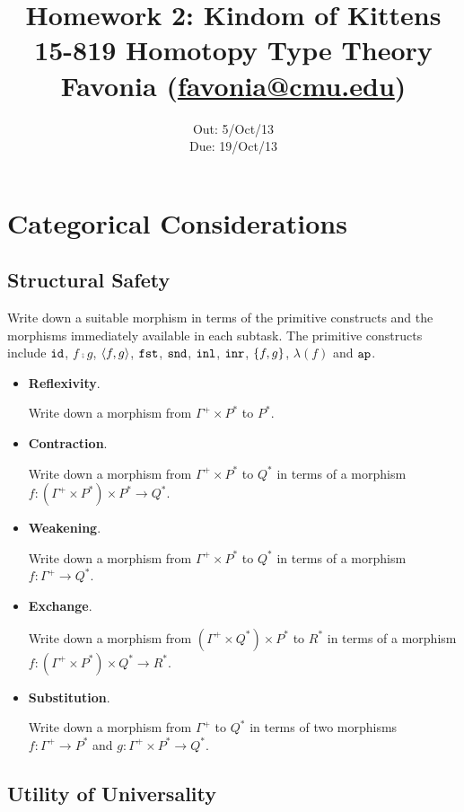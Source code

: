 \documentclass[12pt]{article}
\title{\Large\textbf{
  Homework 2: Kindom of Kittens}
\normalsize\\
15-819 Homotopy Type Theory\\
Favonia (\href{mailto:favonia@cmu.edu}{favonia@cmu.edu})}
\author{}
\date{%
Out: 5/Oct/13\\
Due: 19/Oct/13
}
\begin{document}
\maketitle

\section{Categorical Considerations}

\subsection{Structural Safety}

\begin{task}\label{task:struct}
  Write down a suitable morphism in terms of the primitive constructs
  and the morphisms immediately available in each subtask.
  The primitive constructs include
  $\mathtt{id}$, $f \comp g$, $\langle f,g\rangle$, $\mathtt{fst}$, $\mathtt{snd}$, $\mathtt{inl}$, $\mathtt{inr}$, $\{ f,g\}$, $\lambda(f)$ and $\mathtt{ap}$.
  \begin{itemize}
    \item
      \textbf{Reflexivity}.

      Write down a morphism from $\Gamma^+ \times P^*$ to $P^*$.
    \item
      \textbf{Contraction}.

      Write down a morphism from $\Gamma^+ \times P^*$ to $Q^*$
      in terms of a morphism
      $f : (\Gamma^+ \times P^*) \times P^* \to Q^*$.
    \item
      \textbf{Weakening}.

      Write down a morphism from $\Gamma^+ \times P^*$ to $Q^*$
      in terms of a morphism
      $f : \Gamma^+ \to Q^*$.
    \item
      \textbf{Exchange}.

      Write down a morphism from
      $(\Gamma^+ \times Q^*) \times P^*$ to $R^*$
      in terms of a morphism
      $f : (\Gamma^+ \times P^*) \times Q^* \to R^*$.
    \item
      \textbf{Substitution}.

      Write down a morphism from $\Gamma^+$ to $Q^*$ in terms of
      two morphisms
      $f : \Gamma^+ \to P^*$
      and
      $g : \Gamma^+ \times P^* \to Q^*$.
  \end{itemize}
\end{task}

\subsection{Utility of Universality}
\end{document}
